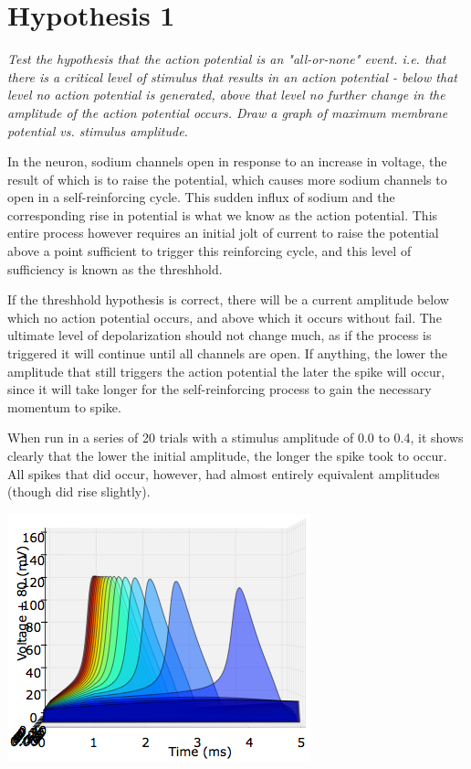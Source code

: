 \documentclass[12pt]{article}
\begin{document}
\maketitle

\section{Hypothesis 1}

\emph{Test the hypothesis that the action potential is an "all-or-none" event. i.e. that there is a critical level of stimulus that results in an action potential - below that level no action potential is generated, above that level no further change in the amplitude of the action potential occurs. Draw a graph of maximum membrane potential vs. stimulus amplitude.}

\vspace{10pt}

In the neuron, sodium channels open in response to an increase in voltage, the result of which is to raise the potential, which causes more sodium channels to open in a self-reinforcing cycle.  This sudden influx of sodium and the corresponding rise in potential is what we know as the action potential.  This entire process however requires an initial jolt of current to raise the potential above a point sufficient to trigger this reinforcing cycle, and this level of sufficiency is known as the threshhold.  

If the threshhold hypothesis is correct, there will be a current amplitude below which no action potential occurs, and above which it occurs without fail.  The ultimate level of depolarization should not change much, as if the process is triggered it will continue until all channels are open.  If anything, the lower the amplitude that still triggers the action potential the later the spike will occur, since it will take longer for the self-reinforcing process to gain the necessary momentum to spike.

When run in a series of 20 trials with a stimulus amplitude of 0.0 to 0.4, it shows clearly that the lower the initial amplitude, the longer the spike took to occur.  All spikes that did occur, however, had almost entirely equivalent amplitudes (though did rise slightly).

\includegraphics[scale=0.7]{stimulusamp-headon.png}
\end{document}
